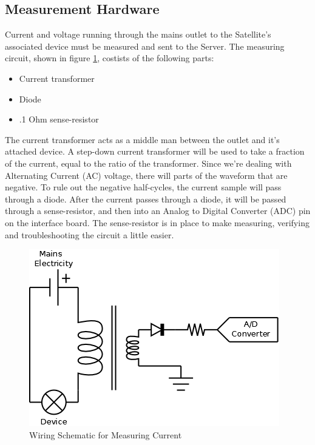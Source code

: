 
\subsection{Measurement Hardware}
Current and voltage running through the mains outlet to the Satellite's associated device must be measured and sent to the Server. 
The measuring circuit, shown in figure \ref{MeasureCircuit}, costists of the following parts:

\begin{itemize}
	\item Current transformer
	\item Diode
	\item .1 Ohm sense-resistor
\end{itemize}

The current transformer acts as a middle man between the outlet and it's attached device. 
A step-down current transformer will be used to take a fraction of the current, equal to the ratio of the transformer. 
Since we're dealing with Alternating Current (AC) voltage, there will parts of the waveform that are negative. 
To rule out the negative half-cycles, the current sample will pass through a diode. 
After the current passes through a diode, it will be passed through a sense-resistor, and then into an Analog to Digital Converter (ADC) pin on the interface board. 
The sense-resistor is in place to make measuring, verifying and troubleshooting the circuit a little easier. 

\begin{figure}[H]
\centering
\includegraphics[scale=0.3]{Hardware/images/MeasureCircuit.png}
\caption{Wiring Schematic for Measuring Current}
\label{MeasureCircuit}
\end{figure}
